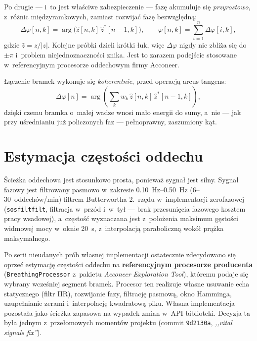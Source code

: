 \documentclass[12pt,a4paper,oneside]{report}
\begin{document}
Po drugie --- i~to jest właściwe zabezpieczenie --- fazę akumuluje się
\emph{przyrostowo}, z~różnic międzyramkowych, zamiast rozwijać fazę
bezwzględną:
\begin{equation}
  \Delta\varphi[n,k] = \arg\!\big( \hat{z}[n,k]\,\hat{z}^{*}[n-1,k] \big),
  \qquad
  \varphi[n,k] = \sum_{i=1}^{n} \Delta\varphi[i,k],
  \label{eq:faza-roznicowa}
\end{equation}
gdzie $\hat{z} = z/|z|$. Kolejne próbki dzieli krótki łuk, więc
$\Delta\varphi$ nigdy nie zbliża się do $\pm\pi$ i~problem niejednoznaczności
znika. Jest to zarazem podejście stosowane w~referencyjnym procesorze
oddechowym firmy Acconeer.

Łączenie bramek wykonuje się \emph{koherentnie}, przed operacją arcus tangens:
\begin{equation}
  \Delta\varphi[n] = \arg \left( \sum_k w_k\, \hat{z}[n,k]\,\hat{z}^{*}[n-1,k] \right),
  \label{eq:koherentne}
\end{equation}
dzięki czemu bramka o~małej wadze wnosi mało energii do sumy, a~nie --- jak
przy uśrednianiu już policzonych faz --- pełnoprawny, zaszumiony kąt.

\section{Estymacja częstości oddechu}
Ścieżka oddechowa jest stosunkowo prosta, ponieważ sygnał jest silny.
Sygnał fazowy jest filtrowany pasmowo w~zakresie
\SIrange{0.10}{0.50}{Hz} (6--30~oddechów/min) filtrem Butterwortha
2.~rzędu w~implementacji zerofazowej (\texttt{sosfiltfilt}, filtracja
w~przód i~w~tył --- brak przesunięcia fazowego kosztem pracy wsadowej),
a~częstość wyznaczana jest z~położenia maksimum gęstości widmowej mocy
w~oknie \SI{20}{s}, z~interpolacją paraboliczną wokół prążka maksymalnego.

Po serii nieudanych prób własnej implementacji ostatecznie zdecydowano się
oprzeć estymację częstości oddechu na \textbf{referencyjnym procesorze
producenta} (\texttt{Breathing\allowbreak Processor} z~pakietu \emph{Acconeer Exploration
Tool}), któremu podaje się wybrany wcześniej segment bramek. Procesor ten
realizuje własne usuwanie echa statycznego (filtr IIR), rozwijanie fazy,
filtrację pasmową, okno Hamminga, uzupełnianie zerami i~interpolację
kwadratową piku. Własna implementacja pozostała jako ścieżka zapasowa na
wypadek zmian w~API biblioteki. Decyzja ta była jednym z~przełomowych momentów
projektu (commit \texttt{9d2130a}, \emph{,,vital signals fix''}).
\end{document}
